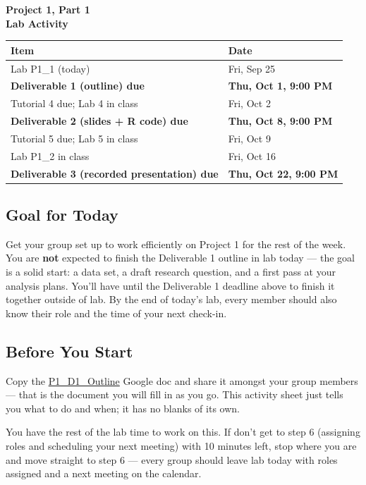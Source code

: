 \documentclass[12pt]{article}
\begin{document}
\begin{center}
\textbf{\Large Project 1, Part 1 \\ Lab Activity}
\end{center}

\begin{center}
\begin{tabular}{ll}
\toprule
\textbf{Item} & \textbf{Date} \\
\midrule
Lab P1\_1 (today) & Fri, Sep 25 \\
\textbf{Deliverable 1 (outline) due} & \textbf{Thu, Oct 1, 9:00 PM} \\
Tutorial 4 due; Lab 4 in class & Fri, Oct 2 \\
\textbf{Deliverable 2 (slides + R code) due} & \textbf{Thu, Oct 8, 9:00 PM} \\
Tutorial 5 due; Lab 5 in class & Fri, Oct 9 \\
Lab P1\_2 in class & Fri, Oct 16 \\
\textbf{Deliverable 3 (recorded presentation) due} & \textbf{Thu, Oct 22, 9:00 PM} \\
\bottomrule
\end{tabular}
\end{center}

\subsection*{Goal for Today}
Get your group set up to work efficiently on Project 1 for the rest of the week. You are \textbf{not} expected to finish the Deliverable 1 outline in lab today --- the goal is a solid start: a data set, a draft research question, and a first pass at your analysis plans. You'll have until the Deliverable 1 deadline above to finish it together outside of lab. By the end of today's lab, every member should also know their role and the time of your next check-in.

\subsection*{Before You Start}
Copy the \href{https://docs.google.com/document/d/1u9wn9czn2f1G6CzEF46wkjXuLb_-Z1Dh_4oGpTxe7AE/edit}{P1\_D1\_Outline} Google doc and share it amongst your group members --- that is the document you will fill in as you go. This activity sheet just tells you what to do and when; it has no blanks of its own.

You have the rest of the lab time to work on this. If don't get to step 6 (assigning roles and scheduling your next meeting) with 10 minutes left, stop where you are and move straight to step 6 --- every group should leave lab today with roles assigned and a next meeting on the calendar.
\end{document}
